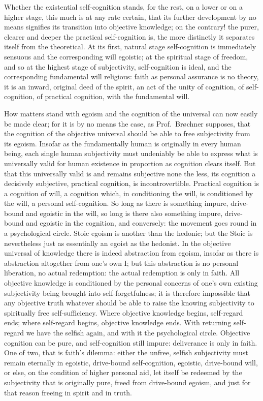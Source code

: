 \documentclass[12pt]{book}
\newcommand{\opage}[1]{\marginnote{\footnotesize\textit{[#1]}}}
\begin{document}
Whether the existential self-cognition stands, for the rest, on a lower or
\opage{17}\setcounter{footnote}{0}%
on a higher stage, this much is at any rate certain, that its further
development by no means signifies its transition into objective knowledge;
on the contrary! the purer, clearer and deeper the practical
self-cognition is, the more distinctly it separates itself from the
theoretical. At its first, natural stage self-cognition is immediately
sensuous and the corresponding will egoistic; at the spiritual stage of
freedom, and so at the highest stage of subjectivity, self-cognition is
ideal, and the corresponding fundamental will religious: faith as personal
assurance is no theory, it is an inward, original deed of the spirit, an
act of the unity of cognition, of self-cognition, of practical cognition,
with the fundamental will.

How matters stand with egoism and the cognition of the universal can now
easily be made clear; for it is by no means the case, as Prof.\ Brøchner
supposes, that the cognition of the objective universal should be able to
free subjectivity from its egoism. Insofar as the fundamentally human is
originally in every human being, each single human subjectivity must
undeniably be able to express what is universally valid for human
existence in proportion as cognition clears itself. But that this
universally valid is and remains subjective none the less, its cognition
a decisively subjective, practical cognition, is incontrovertible.
Practical cognition is a cognition of will, a cognition which, in
conditioning the will, is conditioned by the will, a personal
self-cognition. So long as there is something impure, drive-bound and
egoistic in the will, so long is there also something impure, drive-bound
and egoistic in the cognition, and conversely: the movement goes round in
a psychological circle. Stoic egoism is another than the hedonic; but the
Stoic is nevertheless just as essentially an egoist as the hedonist. In
the objective
\opage{18}\setcounter{footnote}{0}%
universal of knowledge there is indeed abstraction from egoism, insofar
as there is abstraction altogether from one's own I; but this abstraction
is no personal liberation, no actual redemption: the actual redemption is
only in faith. All objective knowledge is conditioned by the personal
concerns of one's own existing subjectivity being brought into
self-forgetfulness; it is therefore impossible that any objective truth
whatever should be able to raise the knowing subjectivity to spiritually
free self-sufficiency. Where objective knowledge begins, self-regard ends;
where self-regard begins, objective knowledge ends. With returning
self-regard we have the selfish again, and with it the psychological
circle. Objective cognition can be pure, and self-cognition still impure:
deliverance is only in faith. One of two, that is faith's dilemma: either
the unfree, selfish subjectivity must remain eternally in egoistic,
drive-bound self-cognition, egoistic, drive-bound will, or else, on the
condition of higher personal aid, let itself be redeemed by the
subjectivity that is originally pure, freed from drive-bound egoism, and
just for that reason freeing in spirit and in truth.
\end{document}
